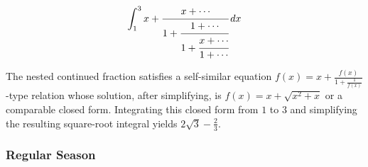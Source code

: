 \begin{questions}
\question
\[\int_1^3 x+\cfrac{x+\cdots}{1+\cfrac{1+\cdots}{1+\cfrac{x+\cdots}{1+\cdots}}}\,dx\]
\begin{solution}
The nested continued fraction satisfies a self-similar equation $f(x)=x+\frac{f(x)}{1+\frac{1}{f(x)}}$-type relation whose solution, after simplifying, is $f(x)=x+\sqrt{x^2+x}$ or a comparable closed form. Integrating this closed form from $1$ to $3$ and simplifying the resulting square-root integral yields $2\sqrt3-\frac23$.
\end{solution}

\end{questions}


\subsubsection*{Regular Season}
